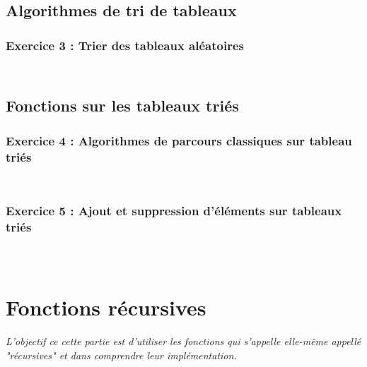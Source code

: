 \inputminted[linenos,firstline=29, lastline=35]{cpp}{../sources/TP1-2/modifTableauxNonTries.c}

\subsection{Algorithmes de tri de tableaux}
\subsubsection{Exercice 3 : Trier des tableaux aléatoires}

\inputminted[linenos,firstline=7, lastline=18]{cpp}{../sources/TP1-2/algosTri.c}

\inputminted[linenos,firstline=20, lastline=31]{cpp}{../sources/TP1-2/algosTri.c}

\subsection{Fonctions sur les tableaux triés}

\subsubsection{Exercice 4 : Algorithmes de parcours classiques sur tableau triés}

\inputminted[linenos,firstline=7, lastline=22]{cpp}{../sources/TP1-2/manipTableauxTries.c}

\inputminted[linenos,firstline=24, lastline=48]{cpp}{../sources/TP1-2/manipTableauxTries.c}

\subsubsection{Exercice 5 : Ajout et suppression d’éléments sur tableaux triés}

\inputminted[linenos,firstline=7, lastline=25]{cpp}{../sources/TP1-2/modifTableauxTries.c}

\inputminted[linenos,firstline=27, lastline=46]{cpp}{../sources/TP1-2/modifTableauxTries.c}

\inputminted[linenos,firstline=48, lastline=81]{cpp}{../sources/TP1-2/modifTableauxTries.c}

\section{Fonctions récursives}
\textit{L’objectif ce cette partie est d’utiliser les fonctions qui s’appelle elle-même appellé "récursives" et dans comprendre leur implémentation.}

